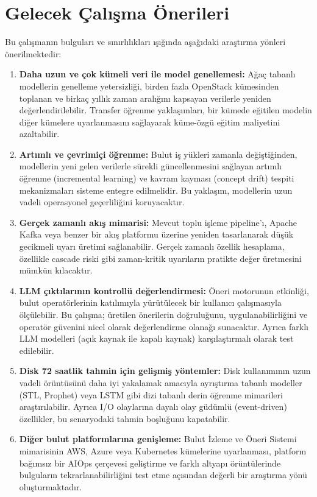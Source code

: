 \section{Gelecek Çalışma Önerileri}
\label{sec:sonuc-gelecek}

Bu çalışmanın bulguları ve sınırlılıkları ışığında aşağıdaki araştırma yönleri önerilmektedir:

\begin{enumerate}
    \item \textbf{Daha uzun ve çok kümeli veri ile model genellemesi:}
    Ağaç tabanlı modellerin genelleme yetersizliği, birden fazla OpenStack kümesinden toplanan ve birkaç yıllık zaman aralığını kapsayan verilerle yeniden değerlendirilebilir.
    Transfer öğrenme yaklaşımları, bir kümede eğitilen modelin diğer kümelere uyarlanmasını sağlayarak küme-özgü eğitim maliyetini azaltabilir.

    \item \textbf{Artımlı ve çevrimiçi öğrenme:}
    Bulut iş yükleri zamanla değiştiğinden, modellerin yeni gelen verilerle sürekli güncellenmesini sağlayan artımlı öğrenme (incremental learning) ve kavram kayması (concept drift) tespiti mekanizmaları sisteme entegre edilmelidir.
    Bu yaklaşım, modellerin uzun vadeli operasyonel geçerliliğini koruyacaktır.

    \item \textbf{Gerçek zamanlı akış mimarisi:}
    Mevcut toplu işleme pipeline'ı, Apache Kafka veya benzer bir akış platformu üzerine yeniden tasarlanarak düşük gecikmeli uyarı üretimi sağlanabilir.
    Gerçek zamanlı özellik hesaplama, özellikle cascade riski gibi zaman-kritik uyarıların pratikte değer üretmesini mümkün kılacaktır.

    \item \textbf{LLM çıktılarının kontrollü değerlendirmesi:}
    Öneri motorunun etkinliği, bulut operatörlerinin katılımıyla yürütülecek bir kullanıcı çalışmasıyla ölçülebilir.
    Bu çalışma; üretilen önerilerin doğruluğunu, uygulanabilirliğini ve operatör güvenini nicel olarak değerlendirme olanağı sunacaktır.
    Ayrıca farklı LLM modelleri (açık kaynak ile kapalı kaynak) karşılaştırmalı olarak test edilebilir.

    \item \textbf{Disk 72 saatlik tahmin için gelişmiş yöntemler:}
    Disk kullanımının uzun vadeli örüntüsünü daha iyi yakalamak amacıyla ayrıştırma tabanlı modeller (STL, Prophet) veya LSTM gibi dizi tabanlı derin öğrenme mimarileri araştırılabilir.
    Ayrıca I/O olaylarına dayalı olay güdümlü (event-driven) özellikler, bu senaryodaki tahmin boşluğunu kapatabilir.

    \item \textbf{Diğer bulut platformlarına genişleme:}
    Bulut İzleme ve Öneri Sistemi mimarisinin AWS, Azure veya Kubernetes kümelerine uyarlanması, platform bağımsız bir AIOps çerçevesi geliştirme ve farklı altyapı örüntülerinde bulguların tekrarlanabilirliğini test etme açısından değerli bir araştırma yönü oluşturmaktadır.
\end{enumerate}


